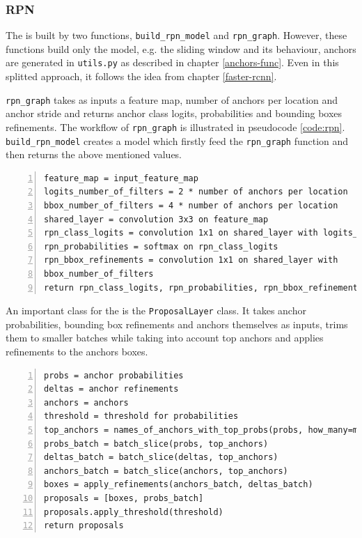 \subsubsection{RPN}
\label{model-rpn}

The  is built by two functions, \verb|build_rpn_model| and 
\verb|rpn_graph|. However, these functions build only the model, e.g. the 
sliding window and its behaviour, anchors are generated in \verb|utils.py| as 
described in chapter \ref{anchors-func}. Even in this splitted approach, it 
follows the idea from chapter \ref{faster-rcnn}.

\verb|rpn_graph| takes as inputs a feature map, number of anchors per location 
and anchor stride and returns anchor class logits, probabilities and bounding 
boxes refinements. The workflow of \verb|rpn_graph| is illustrated in pseudocode 
\ref{code:rpn}. \verb|build_rpn_model| creates a model which firstly feed the 
\verb|rpn_graph| function and then returns the above mentioned values.

{\scriptsize
\begin{lstlisting}[style=python, caption={rpn\_graph}, captionpos=b, 
label=code:rpn, deletekeywords={from, input, map},
backgroundcolor = \color{light-gray}, numbers=left, breaklines=true]
feature_map = input_feature_map
logits_number_of_filters = 2 * number of anchors per location
bbox_number_of_filters = 4 * number of anchors per location
shared_layer = convolution 3x3 on feature_map
rpn_class_logits = convolution 1x1 on shared_layer with logits_number_of_filters
rpn_probabilities = softmax on rpn_class_logits
rpn_bbox_refinements = convolution 1x1 on shared_layer with 
bbox_number_of_filters 
return rpn_class_logits, rpn_probabilities, rpn_bbox_refinements
\end{lstlisting}}

An important class for the  is the \verb|ProposalLayer| class. It takes 
anchor probabilities, bounding box refinements and anchors themselves as inputs, 
trims them to smaller batches while taking into account top anchors and applies 
refinements to the anchors boxes.

{\scriptsize
\begin{lstlisting}[style=python, caption={ProposalLayer}, captionpos=b, 
label=code:prop-layer, deletekeywords={from, input, map, for},
backgroundcolor = \color{light-gray}, numbers=left, breaklines=true]
probs = anchor probabilities
deltas = anchor refinements
anchors = anchors
threshold = threshold for probabilities
top_anchors = names_of_anchors_with_top_probs(probs, how_many=min(6000, len(probs)))
probs_batch = batch_slice(probs, top_anchors)
deltas_batch = batch_slice(deltas, top_anchors)
anchors_batch = batch_slice(anchors, top_anchors)
boxes = apply_refinements(anchors_batch, deltas_batch)
proposals = [boxes, probs_batch]
proposals.apply_threshold(threshold)
return proposals
\end{lstlisting}}

